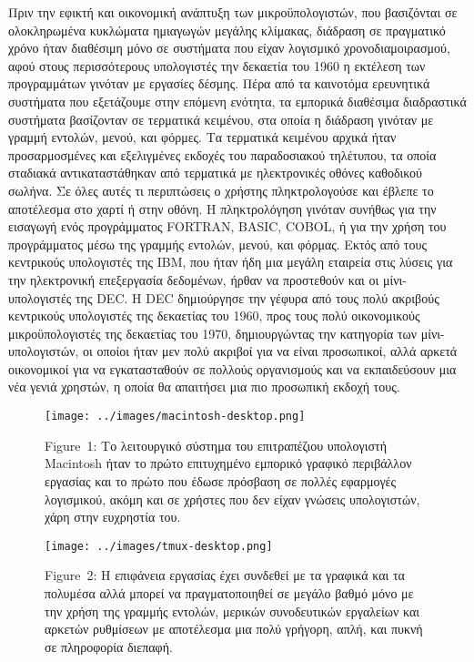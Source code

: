 \documentclass[
]{article}
\begin{document}
Πριν την εφικτή και οικονομική ανάπτυξη των μικροϋπολογιστών, που
βασιζόνται σε ολοκληρωμένα κυκλώματα ημιαγωγών μεγάλης κλίμακας,
διάδραση σε πραγματικό χρόνο ήταν διαθέσιμη μόνο σε συστήματα που είχαν
λογισμικό χρονοδιαμοιρασμού, αφού στους περισσότερους υπολογιστές την
δεκαετία του 1960 η εκτέλεση των προγραμμάτων γινόταν με εργασίες
δέσμης. Πέρα από τα καινοτόμα ερευνητικά συστήματα που εξετάζουμε στην
επόμενη ενότητα, τα εμπορικά διαθέσιμα διαδραστικά συστήματα βασίζονταν
σε τερματικά κειμένου, στα οποία η διάδραση γινόταν με γραμμή εντολών,
μενού, και φόρμες. Τα τερματικά κειμένου αρχικά ήταν προσαρμοσμένες και
εξελιγμένες εκδοχές του παραδοσιακού τηλέτυπου, τα οποία σταδιακά
αντικαταστάθηκαν από τερματικά με ηλεκτρονικές οθόνες καθοδικού σωλήνα.
Σε όλες αυτές τι περιπτώσεις ο χρήστης πληκτρολογούσε και έβλεπε το
αποτέλεσμα στο χαρτί ή στην οθόνη. Η πληκτρολόγηση γινόταν συνήθως για
την εισαγωγή ενός προγράμματος FORTRAN, BASIC, COBOL, ή για την χρήση
του προγράμματος μέσω της γραμμής εντολών, μενού, και φόρμας. Εκτός από
τους κεντρικούς υπολογιστές της IBM, που ήταν ήδη μια μεγάλη εταιρεία
στις λύσεις για την ηλεκτρονική επεξεργασία δεδομένων, ήρθαν να
προστεθούν και οι μίνι-υπολογιστές της DEC. Η DEC δημιούργησε την γέφυρα
από τους πολύ ακριβούς κεντρικούς υπολογιστές της δεκαετίας του 1960,
προς τους πολύ οικονομικούς μικροϋπολογιστές της δεκαετίας του 1970,
δημιουργώντας την κατηγορία των μίνι-υπολογιστών, οι οποίοι ήταν μεν
πολύ ακριβοί για να είναι προσωπικοί, αλλά αρκετά οικονομικοί για να
εγκατασταθούν σε πολλούς οργανισμούς και να εκπαιδεύσουν μια νέα γενιά
χρηστών, η οποία θα απαιτήσει μια πιο προσωπική εκδοχή τους.

\leavevmode{}%
\begin{figure}
\hypertarget{fig:macintosh-desktop}{%
\centering
\texttt{[image: ../images/macintosh-desktop.png]}
\caption{Figure~1: Το λειτουργικό σύστημα του επιτραπέζιου υπολογιστή
Macintosh ήταν το πρώτο επιτυχημένο εμπορικό γραφικό περιβάλλον εργασίας
και το πρώτο που έδωσε πρόσβαση σε πολλές εφαρμογές λογισμικού, ακόμη
και σε χρήστες που δεν είχαν γνώσεις υπολογιστών, χάρη στην ευχρηστία
του.}\label{fig:macintosh-desktop}
}
\end{figure}

\leavevmode{}%
\begin{figure}
\hypertarget{fig:tmux-desktop}{%
\centering
\texttt{[image: ../images/tmux-desktop.png]}
\caption{Figure~2: Η επιφάνεια εργασίας έχει συνδεθεί με τα γραφικά και
τα πολυμέσα αλλά μπορεί να πραγματοποιηθεί σε μεγάλο βαθμό μόνο με την
χρήση της γραμμής εντολών, μερικών συνοδευτικών εργαλείων και αρκετών
ρυθμίσεων με αποτέλεσμα μια πολύ γρήγορη, απλή, και πυκνή σε πληροφορία
διεπαφή.}\label{fig:tmux-desktop}
}
\end{figure}
\end{document}
